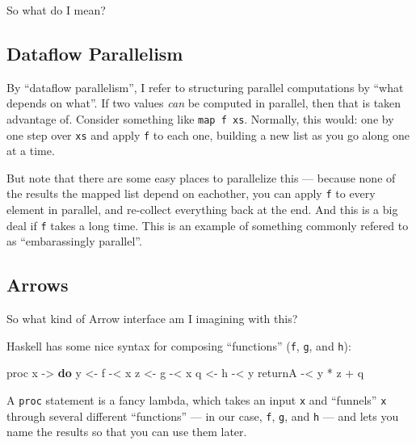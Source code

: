 \documentclass[]{article}
\newenvironment{Shaded}{\begin{snugshade}}{\end{snugshade}}
\newcommand{\FunctionTok}[1]{\textcolor[rgb]{0.00,0.00,0.00}{#1}}
\newcommand{\KeywordTok}[1]{\textcolor[rgb]{0.13,0.29,0.53}{\textbf{#1}}}
\newcommand{\NormalTok}[1]{#1}
\newcommand{\OtherTok}[1]{\textcolor[rgb]{0.56,0.35,0.01}{#1}}
\begin{document}
So what do I mean?

\hypertarget{dataflow-parallelism}{%
\subsection{Dataflow Parallelism}\label{dataflow-parallelism}}

By ``dataflow parallelism'', I refer to structuring parallel computations by
``what depends on what''. If two values \emph{can} be computed in parallel, then
that is taken advantage of. Consider something like \texttt{map\ f\ xs}.
Normally, this would: one by one step over \texttt{xs} and apply \texttt{f} to
each one, building a new list as you go along one at a time.

But note that there are some easy places to parallelize this --- because none of
the results the mapped list depend on eachother, you can apply \texttt{f} to
every element in parallel, and re-collect everything back at the end. And this
is a big deal if \texttt{f} takes a long time. This is an example of something
commonly refered to as ``embarassingly parallel''.

\hypertarget{arrows}{%
\subsection{Arrows}\label{arrows}}

So what kind of Arrow interface am I imagining with this?

Haskell has some nice syntax for composing ``functions'' (\texttt{f},
\texttt{g}, and \texttt{h}):

\begin{Shaded}
\begin{Highlighting}[]
\NormalTok{proc x }\OtherTok{->} \KeywordTok{do}
\NormalTok{    y }\OtherTok{<-}\NormalTok{ f }\FunctionTok{-<}\NormalTok{ x}
\NormalTok{    z }\OtherTok{<-}\NormalTok{ g }\FunctionTok{-<}\NormalTok{ x}
\NormalTok{    q }\OtherTok{<-}\NormalTok{ h }\FunctionTok{-<}\NormalTok{ y}
\NormalTok{    returnA }\FunctionTok{-<}\NormalTok{ y }\FunctionTok{*}\NormalTok{ z }\FunctionTok{+}\NormalTok{ q}
\end{Highlighting}
\end{Shaded}

A \texttt{proc} statement is a fancy lambda, which takes an input \texttt{x} and
``funnels'' \texttt{x} through several different ``functions'' --- in our case,
\texttt{f}, \texttt{g}, and \texttt{h} --- and lets you name the results so that
you can use them later.
\end{document}
